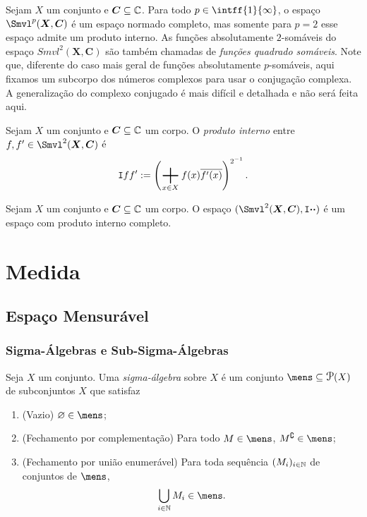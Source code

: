 Sejam $X$ um conjunto e $\bm C \subseteq \mathbb{C}$. Para todo $p \in \intff{1}{\infty}$, o espaço $\Smvl^p(\bm X,\bm C)$ é um espaço normado completo, mas somente para $p=2$ esse espaço admite um produto interno. As funções absolutamente $2$-somáveis do espaço $Smvl^2(\bm X,\bm C)$ são também chamadas de \emph{funções quadrado somáveis}. Note que, diferente do caso mais geral de funções absolutamente $p$-somáveis, aqui fixamos um subcorpo dos números complexos para usar o conjugação complexa. A generalização do complexo conjugado é mais difícil e detalhada e não será feita aqui.

\begin{defi}
Sejam $X$ um conjunto e $\bm C \subseteq \mathbb{C}$ um corpo. O \emph{produto interno} entre $f,f' \in \Smvl^2(\bm X,\bm C)$ é
	\begin{equation*}
	\inte{f}{f'} := \left( \sum_{x \in X} f(x)\overline{f'(x)} \right)^{2\inv}.
	\end{equation*}
\end{defi}

\begin{prop}
Sejam $X$ um conjunto e $\bm C \subseteq \mathbb{C}$ um corpo. O espaço $(\Smvl^2(\bm X,\bm C),\inte{\var}{\var})$ é um espaço com produto interno completo.
\end{prop}











\chapter{Medida}

\section{Espaço Mensurável}

\subsection{Sigma-Álgebras e Sub-Sigma-Álgebras}

\begin{defi}
Seja $X$ um conjunto. Uma \emph{sigma-álgebra} sobre $X$ é um conjunto $\mens \subseteq \p(X)$ de subconjuntos $X$ que satisfaz
	\begin{enumerate}
	\item (Vazio) $\emptyset \in \mens$;
	\item (Fechamento por complementação) Para todo $M \in \mens$, $M^\complement \in \mens$;
	\item (Fechamento por união enumerável) Para toda sequência $(M_i)_{i \in \mathbb{N}}$ de conjuntos de $\mens$,
	\begin{equation*}
	\bigcup_{i \in \N} M_i \in \mens.
	\end{equation*}
	\end{enumerate}
\end{defi}

